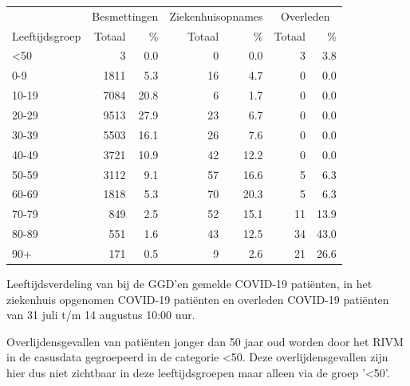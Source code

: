 \documentclass[
  english,
  man,floatsintext]{apa6}
\begin{document}
\begin{table}
\centering\begingroup\fontsize{11}{13}\selectfont

\begin{threeparttable}
\begin{tabular}{lrrrrrr}
\toprule
\multicolumn{1}{c}{ } & \multicolumn{2}{c}{Besmettingen} & \multicolumn{2}{c}{Ziekenhuisopnames} & \multicolumn{2}{c}{Overleden} \\
\cmidrule(l{3pt}r{3pt}){2-3} \cmidrule(l{3pt}r{3pt}){4-5} \cmidrule(l{3pt}r{3pt}){6-7}
Leeftijdsgroep & Totaal & \% & Totaal & \% & Totaal & \%\\
\midrule
<50 & 3 & 0.0 & 0 & 0.0 & 3 & 3.8\\
0-9 & 1811 & 5.3 & 16 & 4.7 & 0 & 0.0\\
10-19 & 7084 & 20.8 & 6 & 1.7 & 0 & 0.0\\
20-29 & 9513 & 27.9 & 23 & 6.7 & 0 & 0.0\\
30-39 & 5503 & 16.1 & 26 & 7.6 & 0 & 0.0\\
40-49 & 3721 & 10.9 & 42 & 12.2 & 0 & 0.0\\
50-59 & 3112 & 9.1 & 57 & 16.6 & 5 & 6.3\\
60-69 & 1818 & 5.3 & 70 & 20.3 & 5 & 6.3\\
70-79 & 849 & 2.5 & 52 & 15.1 & 11 & 13.9\\
80-89 & 551 & 1.6 & 43 & 12.5 & 34 & 43.0\\
90+ & 171 & 0.5 & 9 & 2.6 & 21 & 26.6\\
\bottomrule
\end{tabular}
\begin{tablenotes}
\item[1] Leeftijdsverdeling van bij de GGD’en gemelde COVID-19 patiënten, in het ziekenhuis opgenomen COVID-19 patiënten en overleden COVID-19 patiënten van 31 juli t/m 14 augustus 10:00 uur.
\item[2] Overlijdensgevallen van patiënten jonger dan 50 jaar oud worden door het RIVM in de casusdata gegroepeerd in de categorie <50. Deze overlijdensgevallen zijn hier dus niet zichtbaar in deze leeftijdsgroepen maar alleen via de groep '<50'.
\end{tablenotes}
\end{threeparttable}
\endgroup{}
\end{table}

\newpage
\end{document}
